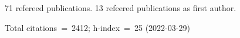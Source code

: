 71 refereed publications. 13 refeered publications as first author.

Total citations~=~2412; h-index~=~25 (2022-03-29)